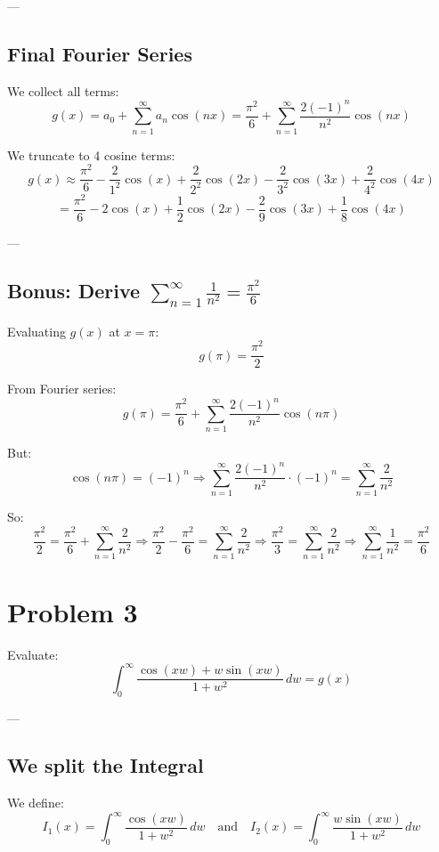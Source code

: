 \documentclass{article}
\begin{document}
---

\subsection*{Final Fourier Series}

We collect all terms:
\[
g(x) = a_0 + \sum_{n=1}^{\infty} a_n \cos(nx) = \frac{\pi^2}{6} + \sum_{n=1}^{\infty} \frac{2(-1)^n}{n^2} \cos(nx)
\]

We truncate to 4 cosine terms:
\[
g(x) \approx \frac{\pi^2}{6} - \frac{2}{1^2} \cos(x) + \frac{2}{2^2} \cos(2x) - \frac{2}{3^2} \cos(3x) + \frac{2}{4^2} \cos(4x)
\]
\[
= \frac{\pi^2}{6} - 2 \cos(x) + \frac{1}{2} \cos(2x) - \frac{2}{9} \cos(3x) + \frac{1}{8} \cos(4x)
\]

---

\subsection*{Bonus: Derive \( \sum_{n=1}^{\infty} \frac{1}{n^2} = \frac{\pi^2}{6} \)}
Evaluating \( g(x) \) at \( x = \pi \):
\[
g(\pi) = \frac{\pi^2}{2}
\]

From Fourier series:
\[
g(\pi) = \frac{\pi^2}{6} + \sum_{n=1}^{\infty} \frac{2(-1)^n}{n^2} \cos(n\pi)
\]

But:
\[
\cos(n\pi) = (-1)^n \Rightarrow \sum_{n=1}^{\infty} \frac{2(-1)^n}{n^2} \cdot (-1)^n = \sum_{n=1}^{\infty} \frac{2}{n^2}
\]

So:
\[
\frac{\pi^2}{2} = \frac{\pi^2}{6} + \sum_{n=1}^{\infty} \frac{2}{n^2}
\Rightarrow \frac{\pi^2}{2} - \frac{\pi^2}{6} = \sum_{n=1}^{\infty} \frac{2}{n^2}
\Rightarrow \frac{\pi^2}{3} = \sum_{n=1}^{\infty} \frac{2}{n^2}
\Rightarrow \sum_{n=1}^{\infty} \frac{1}{n^2} = \boxed{ \frac{\pi^2}{6} }
\]

\newpage
\section*{Problem 3}

Evaluate:
\[
\int_0^\infty \frac{\cos(xw) + w \sin(xw)}{1 + w^2} \, dw = g(x)
\]

---

\subsection*{We split the Integral}

We define:
\[
I_1(x) = \int_0^\infty \frac{\cos(xw)}{1 + w^2} \, dw
\quad\text{and}\quad
I_2(x) = \int_0^\infty \frac{w \sin(xw)}{1 + w^2} \, dw
\]
\end{document}
